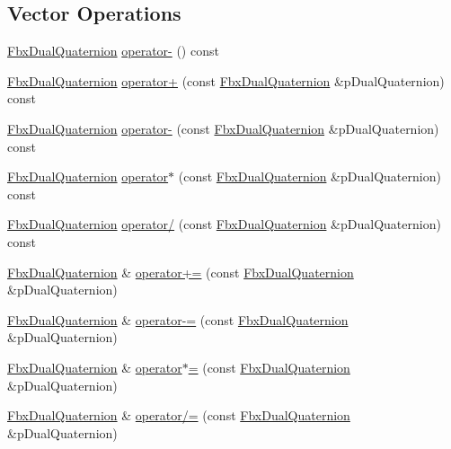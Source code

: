 \subsection*{Vector Operations}
\begin{DoxyCompactItemize}
\item 
\hyperlink{class_fbx_dual_quaternion}{Fbx\+Dual\+Quaternion} \hyperlink{class_fbx_dual_quaternion_a167b1147fed330bb9b2083f3252f30f6}{operator-\/} () const
\item 
\hyperlink{class_fbx_dual_quaternion}{Fbx\+Dual\+Quaternion} \hyperlink{class_fbx_dual_quaternion_a7d1c0685181fa8bdffed35a70e99d2e2}{operator+} (const \hyperlink{class_fbx_dual_quaternion}{Fbx\+Dual\+Quaternion} \&p\+Dual\+Quaternion) const
\item 
\hyperlink{class_fbx_dual_quaternion}{Fbx\+Dual\+Quaternion} \hyperlink{class_fbx_dual_quaternion_a7ae142f9a03771efc12fbdb7a192e7cb}{operator-\/} (const \hyperlink{class_fbx_dual_quaternion}{Fbx\+Dual\+Quaternion} \&p\+Dual\+Quaternion) const
\item 
\hyperlink{class_fbx_dual_quaternion}{Fbx\+Dual\+Quaternion} \hyperlink{class_fbx_dual_quaternion_a232075a06a5afe2bdbdcb71611cd08de}{operator$\ast$} (const \hyperlink{class_fbx_dual_quaternion}{Fbx\+Dual\+Quaternion} \&p\+Dual\+Quaternion) const
\item 
\hyperlink{class_fbx_dual_quaternion}{Fbx\+Dual\+Quaternion} \hyperlink{class_fbx_dual_quaternion_a76538b4d54469e113b1a57881b0cc26a}{operator/} (const \hyperlink{class_fbx_dual_quaternion}{Fbx\+Dual\+Quaternion} \&p\+Dual\+Quaternion) const
\item 
\hyperlink{class_fbx_dual_quaternion}{Fbx\+Dual\+Quaternion} \& \hyperlink{class_fbx_dual_quaternion_a5fac21150ee0620e4cee681adc812e8c}{operator+=} (const \hyperlink{class_fbx_dual_quaternion}{Fbx\+Dual\+Quaternion} \&p\+Dual\+Quaternion)
\item 
\hyperlink{class_fbx_dual_quaternion}{Fbx\+Dual\+Quaternion} \& \hyperlink{class_fbx_dual_quaternion_a51b0a1b4483267962470cb607754f508}{operator-\/=} (const \hyperlink{class_fbx_dual_quaternion}{Fbx\+Dual\+Quaternion} \&p\+Dual\+Quaternion)
\item 
\hyperlink{class_fbx_dual_quaternion}{Fbx\+Dual\+Quaternion} \& \hyperlink{class_fbx_dual_quaternion_ad111738104db31db04967420eea645a0}{operator$\ast$=} (const \hyperlink{class_fbx_dual_quaternion}{Fbx\+Dual\+Quaternion} \&p\+Dual\+Quaternion)
\item 
\hyperlink{class_fbx_dual_quaternion}{Fbx\+Dual\+Quaternion} \& \hyperlink{class_fbx_dual_quaternion_a9fd67ddddaf240850ce7c5fbe801e164}{operator/=} (const \hyperlink{class_fbx_dual_quaternion}{Fbx\+Dual\+Quaternion} \&p\+Dual\+Quaternion)

\end{DoxyCompactItemize}
